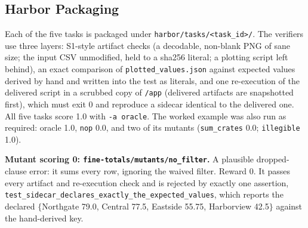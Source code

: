 \documentclass[11pt]{article}
\begin{document}
\subsection{Harbor Packaging}
Each of the five tasks is packaged under \texttt{harbor/tasks/<task\_id>/}.
The verifiers use three layers: S1-style artifact checks (a decodable,
non-blank PNG of sane size; the input CSV unmodified, held to a sha256
literal; a plotting script left behind), an exact comparison of
\texttt{plotted\_values.json} against expected values derived by hand and
written into the test as literals, and one re-execution of the delivered
script in a scrubbed copy of \texttt{/app} (delivered artifacts are
snapshotted first), which must exit 0 and reproduce a sidecar identical to
the delivered one. All five tasks score 1.0 with \texttt{-a oracle}. The
worked example was also run as required: oracle 1.0, \texttt{nop} 0.0, and
two of its mutants (\texttt{sum\_crates} 0.0; \texttt{illegible} 1.0).

\textbf{Mutant scoring 0: \texttt{fine-totals/mutants/no\_filter}.} A
plausible dropped-clause error: it sums every row, ignoring the waived
filter. Reward 0. It passes every artifact and re-execution check and is
rejected by exactly one assertion,
\texttt{test\_sidecar\_declares\_}\allowbreak\texttt{exactly\_the\_expected\_values},
which
reports the declared $\{$Northgate 79.0, Central 77.5, Eastside 55.75,
Harborview 42.5$\}$ against the hand-derived key.
\end{document}
